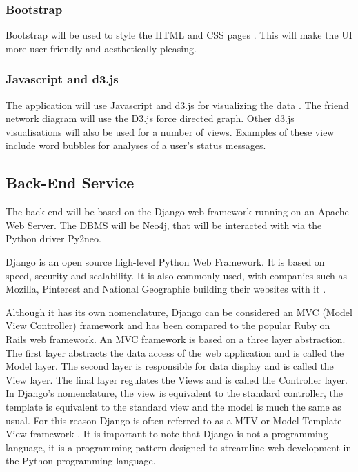 \documentclass[12pt,onecolumn]{article}
\begin{document}
	\subsubsection*{Bootstrap}
	Bootstrap will be used to style the HTML and CSS pages \cite{Bootstrap}. This will make the UI more user friendly and aesthetically pleasing.
	
	\subsubsection*{Javascript and d3.js}
	The application will use Javascript and d3.js for visualizing the data \cite{D3}. The friend network diagram will use the D3.js force directed graph. Other d3.js visualisations will also be used for a number of views. Examples of these view include word bubbles for analyses of a user's status messages.
	
	\subsection{Back-End Service} \label{backsec}
	
	The back-end will be based on the Django web framework running on an Apache Web Server. The DBMS will be Neo4j, that will be interacted with via the Python driver Py2neo. 
	
	
	Django is an open source high-level Python Web Framework. It is based on speed, security and scalability. It is also commonly used, with companies such as Mozilla, Pinterest and National Geographic building their websites with it \cite{django}. 
	
	Although it has its own nomenclature, Django can be considered an MVC (Model View Controller) framework and has been compared to the popular Ruby on Rails web framework. An MVC framework is based on a three layer abstraction. The first layer abstracts the data access of the web application and is called the Model layer. The second layer is responsible for data display and is called the View layer. The final layer regulates the Views and is called the Controller layer. In Django's nomenclature, the view is equivalent to the standard controller, the template is equivalent to the standard view and the model is much the same as usual. For this reason Django is often referred to as a MTV or Model Template View framework \cite{djangobook}. It is important to note that Django is not a programming language, it is a programming pattern designed to streamline web development in the Python programming language.
	
\end{document}

